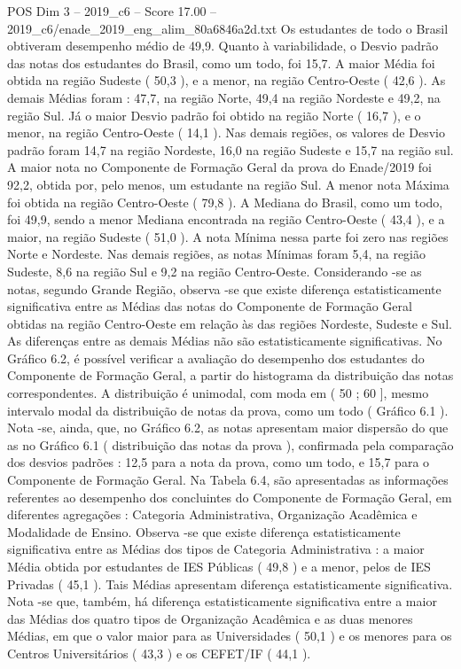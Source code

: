 \begin{textsample}{POS Dim 3 – 2019\_c6 – Score 17.00 – 2019\_c6/enade\_2019\_eng\_alim\_80a6846a2d.txt}
Os estudantes de todo o Brasil obtiveram desempenho médio de 49,9.
Quanto à variabilidade, o Desvio padrão das notas dos estudantes do Brasil, como um todo, foi 15,7.
A maior Média foi obtida na região Sudeste ( 50,3 ), e a menor, na região Centro-Oeste ( 42,6 ).
As demais Médias foram : 47,7, na região Norte, 49,4 na região Nordeste e 49,2, na região Sul.
Já o maior Desvio padrão foi obtido na região Norte ( 16,7 ), e o menor, na região Centro-Oeste ( 14,1 ).
Nas demais regiões, os valores de Desvio padrão foram 14,7 na região Nordeste, 16,0 na região Sudeste e 15,7 na região sul.
A maior nota no Componente de Formação Geral da prova do Enade/2019 foi 92,2, obtida por, pelo menos, um estudante na região Sul.
A menor nota Máxima foi obtida na região Centro-Oeste ( 79,8 ).
A Mediana do Brasil, como um todo, foi 49,9, sendo a menor Mediana encontrada na região Centro-Oeste ( 43,4 ), e a maior, na região Sudeste ( 51,0 ).
A nota Mínima nessa parte foi zero nas regiões Norte e Nordeste.
Nas demais regiões, as notas Mínimas foram 5,4, na região Sudeste, 8,6 na região Sul e 9,2 na região Centro-Oeste.
Considerando -se as notas, segundo Grande Região, observa -se que existe diferença estatisticamente significativa entre as Médias das notas do Componente de Formação Geral obtidas na região Centro-Oeste em relação às das regiões Nordeste, Sudeste e Sul.
As diferenças entre as demais Médias não são estatisticamente significativas.
No Gráfico 6.2, é possível verificar a avaliação do desempenho dos estudantes do Componente de Formação Geral, a partir do histograma da distribuição das notas correspondentes.
A distribuição é unimodal, com moda em ( 50 ; 60 ], mesmo intervalo modal da distribuição de notas da prova, como um todo ( Gráfico 6.1 ).
Nota -se, ainda, que, no Gráfico 6.2, as notas apresentam maior dispersão do que as no Gráfico 6.1 ( distribuição das notas da prova ), confirmada pela comparação dos desvios padrões : 12,5 para a nota da prova, como um todo, e 15,7 para o Componente de Formação Geral.
Na Tabela 6.4, são apresentadas as informações referentes ao desempenho dos concluintes do Componente de Formação Geral, em diferentes agregações : Categoria Administrativa, Organização Acadêmica e Modalidade de Ensino.
Observa -se que existe diferença estatisticamente significativa entre as Médias dos tipos de Categoria Administrativa : a maior Média obtida por estudantes de IES Públicas ( 49,8 ) e a menor, pelos de IES Privadas ( 45,1 ).
Tais Médias apresentam diferença estatisticamente significativa.
Nota -se que, também, há diferença estatisticamente significativa entre a maior das Médias dos quatro tipos de Organização Acadêmica e as duas menores Médias, em que o valor maior para as Universidades ( 50,1 ) e os menores para os Centros Universitários ( 43,3 ) e os CEFET/IF ( 44,1 ).

\end{textsample}
